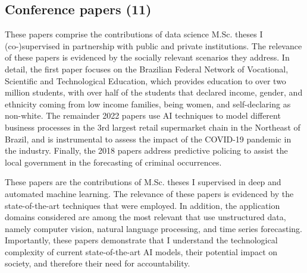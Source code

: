 \documentclass[11pt,a4paper,sans]{moderncv} %
\begin{document}
\subsection{Conference papers (11)}

{These papers comprise the contributions of data science M.Sc. theses I (co-)supervised in partnership with public and private institutions. The relevance of these papers is evidenced by the socially relevant scenarios they address. In detail, the first paper focuses on the Brazilian Federal Network of Vocational, Scientific and Technological Education, which provides education to over two million students, with over half of the students that declared income, gender, and ethnicity coming from low income families, being women, and self-declaring as non-white. The remainder 2022 papers use AI techniques to model different business processes in the 3rd largest retail supermarket chain in the Northeast of Brazil, and is instrumental to assess the impact of the COVID-19 pandemic in the industry. Finally, the 2018 papers address predictive policing to assist the local government in the forecasting of criminal occurrences.}
\cvline{}{\hrule}

%
{These papers are the contributions of M.Sc. theses I supervised in deep and automated machine learning. The relevance of these papers is evidenced by the state-of-the-art techniques that were employed. In addition, the application domains considered are among the most relevant that use unstructured data, namely computer vision, natural language processing, and time series forecasting. Importantly, these papers demonstrate that I understand the technological complexity of current state-of-the-art AI models, their potential impact on society, and therefore their need for accountability.}
\end{document}
